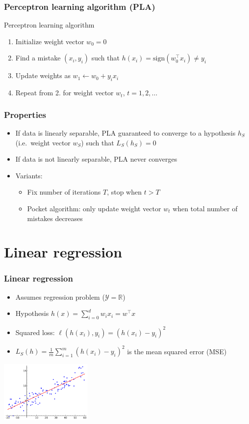 \documentclass[10pt]{beamer}
\begin{document}
\begin{frame}
  \frametitle{Perceptron learning algorithm (PLA)}
  \begin{block}{Perceptron learning algorithm}
  \begin{enumerate}
	\item Initialize weight vector $w_0=0$
	\item Find a {\color{red} mistake} $(x_i,y_i)$ such that $h(x_i)=\mathrm{sign}(w_0^\top x_i) \neq y_i$
	\item Update weights as $w_1\leftarrow w_0+y_ix_i$
	\item Repeat from 2. for weight vector $w_t$, $t=1,2,\ldots$
  \end{enumerate}
  \end{block}
\end{frame}

\begin{frame}
  \frametitle{Properties}
  \begin{itemize}
	\item If data is {\color{red} linearly separable}, PLA guaranteed to converge to a hypothesis $h_S$ (i.e.~weight vector $w_S$) such that $L_S(h_S)=0$
	\item If data is {\color{blue} not} linearly separable, PLA never converges
	\item Variants:
  \begin{itemize}
	\item Fix number of iterations $T$, stop when $t>T$
	\item {\color{green} Pocket algorithm}: only update weight vector $w_t$ when total number of mistakes decreases
  \end{itemize}
  \end{itemize}
\end{frame}

\section{Linear regression}

\begin{frame}
  \frametitle{Linear regression}
  \begin{itemize}
	\item Assumes {\color{red} regression problem} ($\mathcal{Y}=\mathbb{R}$)
	\item Hypothesis $h(x)=\sum_{i=0}^d w_ix_i=w^\top x$
	\item Squared loss: $\ell(h(x_i),y_i) = (h(x_i)-y_i)^2$
	\item $L_S(h) = \frac 1 m \sum_{i=1}^m (h(x_i)-y_i)^2$ is the {\color{green} mean squared error} (MSE)
  \end{itemize}
  \begin{center}
  \includegraphics[height=3cm]{images/linreg.png}
  \end{center}
\end{frame}
\end{document}

